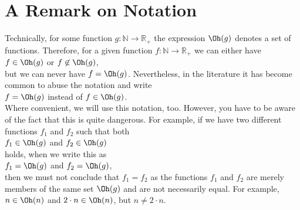\section{A Remark on Notation}
Technically, for some function $g:\mathbb{N} \rightarrow \mathbb{R}_+$ the expression $\Oh(g)$
denotes a set of functions.  Therefore, for a given function $f:\mathbb{N} \rightarrow \mathbb{R}_+$ we can
either have
\\[0.2cm]
\hspace*{1.3cm}
$f \in \Oh(g)$ \quad or \quad $f \not\in \Oh(g)$,
\\[0.2cm]
but we can never have $f = \Oh(g)$.  Nevertheless, in the literature it has become common to abuse the
notation and write
\\[0.2cm]
\hspace*{1.3cm}
$f = \Oh(g)$ \quad instead of \quad $f \in \Oh(g)$.
\\[0.2cm]
Where convenient, we will use this notation, too.  However, you have to be aware of the fact that
this is quite dangerous.  For example, if we have two different functions $f_1$ and
$f_2$ such that both
\\[0.2cm]
\hspace*{1.3cm}
$f_1 \in \Oh(g)$ \quad and \quad $f_2 \in \Oh(g)$
\\[0.2cm]
holds, when we write this as
\\[0.2cm]
\hspace*{1.3cm}
$f_1 = \Oh(g)$ \quad and \quad $f_2 = \Oh(g)$,
\\[0.2cm]
then we must not conclude that $f_1 = f_2$ as the functions $f_1$ and $f_2$ are merely members of
the same set $\Oh(g)$ and are not necessarily equal.  For example, $n \in \Oh(n)$ and 
$2 \cdot n \in \Oh(n)$,  but $n \not= 2 \cdot n$.
\vspace*{0.3cm}

